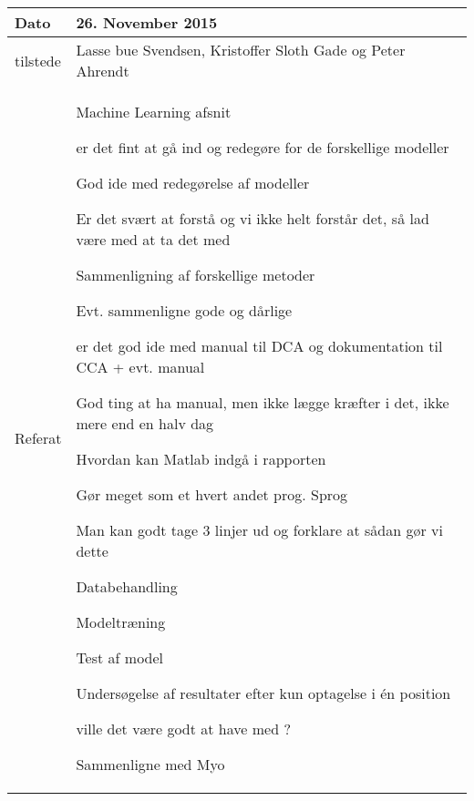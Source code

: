 \begin{center}
	\begin{tabular}{| l | p{10cm} |}
		\hline
		Dato		& 26. November 2015\\ \hline
		tilstede 	& Lasse bue Svendsen, Kristoffer Sloth Gade og Peter Ahrendt\\ \hline
		Referat		& \vspace{-5mm}\begin{myEnumerate}
			\item Machine Learning afsnit
			\begin{myItemize}				
				\item er det fint at gå ind og redegøre for de forskellige modeller
				\begin{myItemize}
					\item God ide med redegørelse af modeller
					\item Er det svært at forstå og vi ikke helt forstår det, så lad være med at ta det med
					\item Sammenligning af forskellige metoder
				\end{myItemize}
				\item Evt. sammenligne gode og dårlige
			\end{myItemize}
			\item er det god ide med manual til DCA og dokumentation til CCA + evt. manual
			\begin{myItemize}
				\item God ting at ha manual, men ikke lægge kræfter i det, ikke mere end en halv dag
			\end{myItemize}
			\item Hvordan kan Matlab indgå i rapporten
			\begin{myItemize}
				\item Gør meget som et hvert andet prog. Sprog
				\item Man kan godt tage 3 linjer ud og forklare at sådan gør vi dette
				\item Databehandling
				\item Modeltræning
				\item Test af model
			\end{myItemize}
			\item Undersøgelse af resultater efter kun optagelse i én position
			\begin{myItemize}
				\item ville det være godt at have med ?
				\item Sammenligne med Myo
			\end{myItemize}
		\end{myEnumerate}\\ 	
		\hline
	\end{tabular}
\end{center}